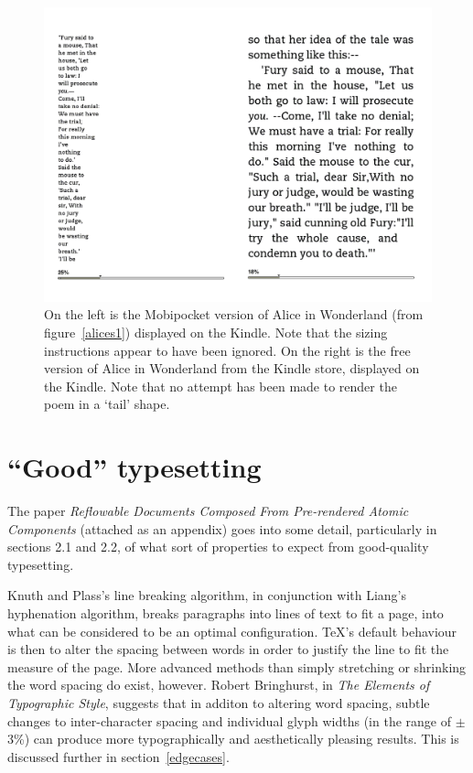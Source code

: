 \begin{figure}[tb]
\begin{center}
\vspace{-.3in}
\includegraphics[width=\textwidth]{gfx/alices2}
\end{center}
\vspace{-.3in}
\caption[The same document displayed on the Kindle]{On
the left is the Mobipocket version of Alice in Wonderland (from figure~\ref{alices1}) displayed on
the Kindle. Note that the sizing instructions appear to have been ignored. On the right is the free
version of Alice in Wonderland from the Kindle store, displayed on the Kindle. Note that no attempt
has been made to render the poem in a `tail' shape.}
\label{alices2}
\end{figure}

\section{``Good'' typesetting}
\label{goodtypesetting}
The paper \emph{Reflowable Documents Composed From Pre-rendered Atomic Components}\cite{Pinkney2011}
(attached as an appendix) goes into some detail, particularly in sections 2.1 and 2.2, of what sort
of properties to expect from good-quality typesetting.

Knuth and Plass's line breaking algorithm\cite{Knuth1981}, in conjunction with Liang's hyphenation
algorithm\cite{Liang1983}, breaks paragraphs into lines of text to fit a page, into what can be
considered to be an optimal configuration. \TeX 's default behaviour is then to alter the spacing
between words in order to justify the line to fit the measure of the page. More advanced methods
than simply stretching or shrinking the word spacing do exist, however. Robert Bringhurst, in
\emph{The Elements of Typographic Style}\cite{Bringhurst2008}, suggests that in additon to altering
word spacing, subtle changes to inter-character spacing and individual glyph widths (in the range of
$\pm$ 3\%) can produce more typographically and aesthetically pleasing results. This is discussed
further in section~\ref{edgecases}.




